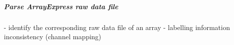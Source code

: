 







\subparagraph{\textit{Parse ArrayExpress raw data file}}


% 
%
%

%
%

- identify the corresponding raw data file of an array
- labelling information inconsistency (channel mapping) 


